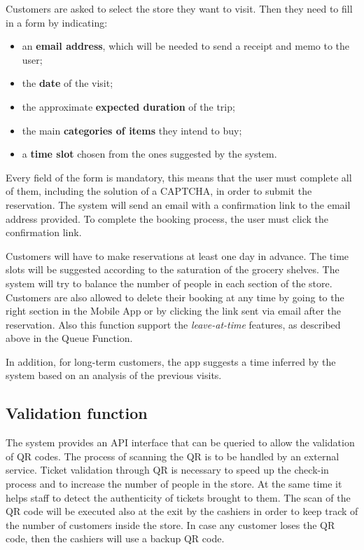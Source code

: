 	Customers are asked to select the store they want to visit. Then they need to fill in a form by indicating:
	\begin{itemize}
		\item an \textbf{email address}, which will be needed to send a receipt and memo to the user;
		\item the \textbf{date} of the visit;
		\item the approximate \textbf{expected duration} of the trip;
	 	\item the main \textbf{categories of items} they intend to buy;
	    \item a \textbf{time slot} chosen from the ones suggested by the system.
	\end{itemize}
	Every field of the form is mandatory, this means that the user must complete all of them, including the solution of a CAPTCHA, in order to submit the reservation.
	The system will send an email with a confirmation link to the email address provided. To complete the booking process, the user must click the confirmation link.

	Customers will have to make reservations at least one day in advance.
	The time slots will be suggested according to the saturation of the grocery shelves. The system will try to balance the number of people in each section of the store.\newline
	Customers are also allowed to delete their booking at any time by going to the right section in the Mobile App or by clicking the link sent via email after the reservation.
	Also this function support the \textit{leave-at-time} features, as described above in the Queue Function.

	In addition, for long-term customers, the app suggests a time inferred by the system based on an analysis of the previous visits.

\subsection{Validation function}
The system provides an API interface that can be queried to allow the validation of QR codes. The process of scanning the QR is to be handled by an external service.\newline
Ticket validation through QR is necessary to speed up the check-in process and to increase the number of people in the store. At the same time it helps staff to detect the authenticity of tickets brought to them.\newline
The scan of the QR code will be executed also at the exit by the cashiers in order to keep track of the number of customers inside the store. In case any customer loses the QR code, then the cashiers will use a backup QR code.

